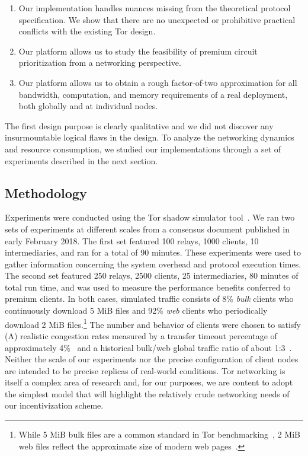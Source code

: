 \begin{enumerate}
\item Our implementation handles nuances missing from the theoretical protocol specification. We show that there are no unexpected or prohibitive practical conflicts with the existing Tor design.
\item Our platform allows us to study the feasibility of premium circuit prioritization from a networking perspective.
\item Our platform allows us to obtain a rough factor-of-two approximation for all bandwidth, computation, and memory requirements of a real deployment, both globally and at individual nodes.
\end{enumerate}

The first design purpose is clearly qualitative and we did not discover any insurmountable logical flaws in the design.
To analyze the networking dynamics and resource consumption, we studied our implementations through a set of experiments described in the next section.

\subsection{Methodology}
\label{subsec:methodology}

Experiments were conducted using the Tor shadow simulator tool~\cite{jansen2011shadow, tracey2018high}.
We ran two sets of experiments at different scales from a consensus document published in early February 2018.
The first set featured 100 relays, 1000 clients, 10 intermediaries, and ran for a total of 90 minutes.
These experiments were used to gather information concerning the system overhead and protocol execution times.
The second set featured 250 relays, 2500 clients, 25 intermediaries, 80 minutes of total run time, and was used to measure the performance benefits conferred to premium clients.
In both cases, simulated traffic consists of 8\% \emph{bulk} clients who continuously download 5 MiB files and 92\% \emph{web} clients who periodically download 2 MiB files.\footnote{While 5 MiB bulk files are a common standard in Tor benchmarking~\cite{portal2018tormetrics}, 2 MiB web files reflect the approximate size of modern web pages~\cite{team2018httparchive}.}
The number and behavior of clients were chosen to satisfy (A) realistic congestion rates measured by a transfer timeout percentage of approximately 4\%~\cite{portal2018tormetrics} and a historical bulk/web global traffic ratio of about 1:3~\cite{privcount-ccs2016, learning-ccs2018}.
Neither the scale of our experiments nor the precise configuration of client nodes are intended to be precise replicas of real-world conditions.
Tor networking is itself a complex area of research and, for our purposes, we are content to adopt the simplest model that will highlight the relatively crude networking needs of our incentivization scheme.

